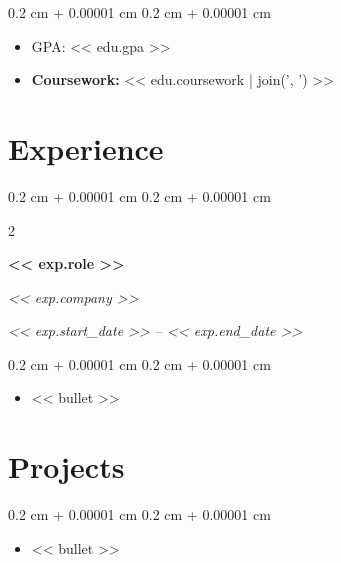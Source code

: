 \documentclass[10pt, letterpaper]{article}
\newenvironment{highlights}{
    \begin{itemize}[
        topsep=0.10 cm,
        parsep=0.10 cm,
        partopsep=0pt,
        itemsep=0pt,
        leftmargin=0.4 cm + 10pt
    ]
}{
    \end{itemize}
}
\newenvironment{onecolentry}{
    \begin{adjustwidth}{
        0.2 cm + 0.00001 cm
    }{
        0.2 cm + 0.00001 cm
    }
}{
    \end{adjustwidth}
}
\newenvironment{twocolentry}[2][]{
    \onecolentry
    \def\secondColumn{#2}
    \setcolumnwidth{\fill, 4.5 cm}
    \begin{paracol}{2}
}{
    \switchcolumn \raggedleft \secondColumn
    \end{paracol}
    \endonecolentry
}
\let\hrefWithoutArrow\href
\renewcommand{\href}[2]{\hrefWithoutArrow{#1}{\ifthenelse{\equal{#2}{}}{ }{#2 }\raisebox{.15ex}{\footnotesize \faExternalLink}}}
\begin{document}
        \vspace{0.10 cm}
        \begin{onecolentry}
            \begin{highlights}
                \item GPA: << edu.gpa >>
                \item \textbf{Coursework:} << edu.coursework | join(', ') >>
            \end{highlights}
        \end{onecolentry}
        \vspace{0.2 cm}


    \section{Experience}
        \begin{twocolentry}{
            \textit{<< exp.start_date >> -- << exp.end_date >>}}
            \textbf{<< exp.role >>}

            \textit{<< exp.company >>}
        \end{twocolentry}

        \vspace{0.10 cm}
        \begin{onecolentry}
            \begin{highlights}
                \item << bullet >>
            \end{highlights}
        \end{onecolentry}
        \vspace{0.20 cm}


    \section{Projects}

        \vspace{0.10 cm}
        \begin{onecolentry}
            \begin{highlights}
                \item << bullet >>
            \end{highlights}
        \end{onecolentry}
        \vspace{0.20 cm}
\end{document}
